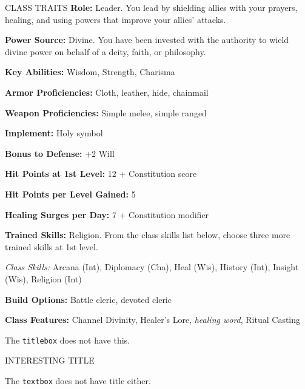 \documentclass[mmgreen]{dnd4e}
\begin{document}
\begin{traitsbox}{CLASS TRAITS}
	\textbf{Role:} Leader. You lead by shielding allies with your prayers, healing, and using powers that improve your allies’ attacks.


	\textbf{Power Source:} Divine. You have been invested with the authority to wield divine power on behalf of a deity, faith, or philosophy.

	\textbf{Key Abilities:} Wisdom, Strength, Charisma

	\vspace{1em}

	\textbf{Armor Proficiencies:} Cloth, leather, hide, chainmail

	\textbf{Weapon Proficiencies:} Simple melee, simple ranged

	\textbf{Implement:} Holy symbol

	\textbf{Bonus to Defense:} +2 Will

	\vspace{1em}

	\textbf{Hit Points at 1st Level:} 12 + Constitution score

	\textbf{Hit Points per Level Gained:} 5

	\textbf{Healing Surges per Day:} 7 + Constitution modifier

	\vspace{1em}

	\textbf{Trained Skills:} Religion. From the class skills list below, choose three more trained skills at 1st level.

	\noindent\textit{Class Skills:} Arcana (Int), Diplomacy (Cha), Heal (Wis), History (Int), Insight (Wis), Religion (Int)

	\vspace{1em}

	\textbf{Build Options:} Battle cleric, devoted cleric

	\textbf{Class Features:} Channel Divinity, Healer’s Lore, \textit{healing word}, Ritual Casting

	\vspace{1em}
\end{traitsbox}

The \texttt{titlebox} does not have this.


\begin{titlebox}{INTERESTING TITLE}
	\lipsum[][1-5]
\end{titlebox}

The \texttt{textbox} does not have title either.
\end{document}
